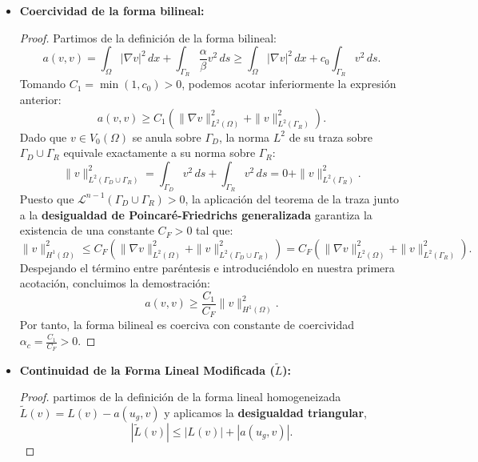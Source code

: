 \documentclass[11pt]{book}
\theoremstyle{plain} %
\theoremstyle{definition} %
\theoremstyle{definition} %
\begin{document}
\begin{itemize}
    \item \textbf{Coercividad de la forma bilineal:}
    \begin{proof}
    Partimos de la definición de la forma bilineal:
    \begin{equation*}
        a(v,v) = \int_\Omega |\nabla v|^2 \, dx + \int_{\Gamma_R} \frac{\alpha}{\beta}v^2 \, ds \geq \int_\Omega |\nabla v|^2 \, dx + c_0 \int_{\Gamma_R} v^2 \, ds.
    \end{equation*}
    Tomando $C_1 = \min(1, c_0) > 0$, podemos acotar inferiormente la expresión anterior:
    \begin{equation*}
        a(v,v) \geq C_1 \left( \|\nabla v\|^2_{L^2(\Omega)} + \|v\|^2_{L^2(\Gamma_R)} \right).
    \end{equation*}
    Dado que $v \in V_0(\Omega)$ se anula sobre $\Gamma_D$, la norma $L^2$ de su traza sobre $\Gamma_D \cup \Gamma_R$ equivale exactamente a su norma sobre $\Gamma_R$:
    \begin{equation*}
        \|v\|^2_{L^2(\Gamma_D \cup \Gamma_R)} = \int_{\Gamma_D} v^2 \, ds + \int_{\Gamma_R} v^2 \, ds = 0 + \|v\|^2_{L^2(\Gamma_R)}.
    \end{equation*}
    Puesto que $\mathcal{L}^{n-1}(\Gamma_D \cup \Gamma_R) > 0$, la aplicación del teorema de la traza junto a la \textbf{desigualdad de Poincaré-Friedrichs generalizada} garantiza la existencia de una constante $C_F > 0$ tal que:
    \begin{equation*}
        \|v\|^2_{H^1(\Omega)} \leq C_F \left( \|\nabla v\|^2_{L^2(\Omega)} + \|v\|^2_{L^2(\Gamma_D \cup \Gamma_R)} \right) = C_F \left( \|\nabla v\|^2_{L^2(\Omega)} + \|v\|^2_{L^2(\Gamma_R)} \right).
    \end{equation*}
    Despejando el término entre paréntesis e introduciéndolo en nuestra primera acotación, concluimos la demostración:
    \begin{equation*}
        a(v,v) \geq \frac{C_1}{C_F} \|v\|^2_{H^1(\Omega)}.
    \end{equation*}
    Por tanto, la forma bilineal es coerciva con constante de coercividad $\alpha_c = \frac{C_1}{C_F} > 0$.
    \end{proof}
    \item \textbf{Continuidad de la Forma Lineal Modificada ($\widetilde{L}$):}\begin{proof} partimos de la definición de la forma lineal homogeneizada $\widetilde{L}(v) = L(v) - a(u_g, v)$ y aplicamos la \textbf{desigualdad triangular},
    \[ |\widetilde{L}(v)| \leq |L(v)| + |a(u_g, v)|. \]

\end{proof}
\end{itemize}
\end{document}
